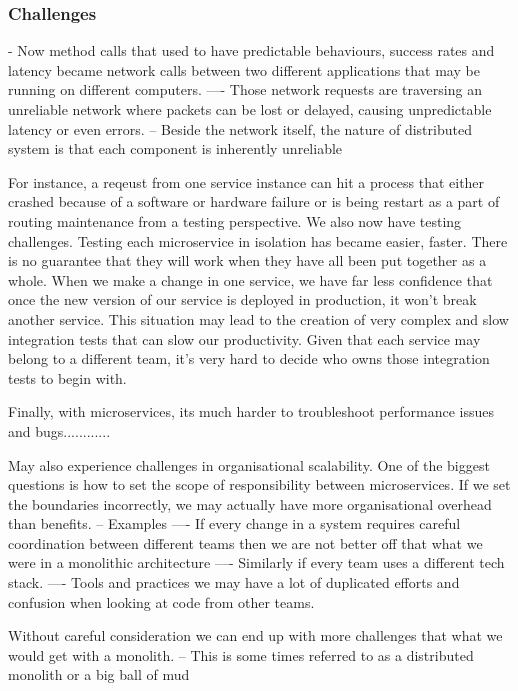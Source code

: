 \documentclass[a4paper, 11pt]{book}
\begin{document}
    \subsubsection{Challenges}
    - Now method calls that used to have predictable behaviours, success rates and latency became network calls between two different applications that may be running on different computers.
    ---- Those network requests are traversing an unreliable network where packets can be lost or delayed, causing unpredictable latency or even errors.
    -- Beside the network itself, the nature of distributed system is that each component is inherently unreliable

    For instance, a reqeust from one service instance can hit a process that either crashed because of a software or hardware failure or is being restart as a part of routing maintenance from a testing perspective.
    We also now have testing challenges.
    Testing each microservice in isolation has became easier, faster.
    There is no guarantee that they will work when they have all been put together as a whole.
    When we make a change in one service, we have far less confidence that once the new version of our service is deployed in production, it won't break another service.
    This situation may lead to the creation of very complex and slow integration tests that can slow our productivity.
    Given that each service may belong to a different team, it's very hard to decide who owns those integration tests to begin with.

    Finally, with microservices, its much harder to troubleshoot performance issues and bugs............

    May also experience challenges in organisational scalability.
    One of the biggest questions is how to set the scope of responsibility between microservices.
    If we set the boundaries incorrectly, we may actually have more organisational overhead than benefits.
    -- Examples
    ---- If every change in a system requires careful coordination between different teams then we are not better off that what we were in a monolithic architecture
    ---- Similarly if every team uses a different tech stack.
    ---- Tools and practices we may have a lot of duplicated efforts and confusion when looking at code from other teams.

    Without careful consideration we can end up with more challenges that what we would get with a monolith.
    -- This is some times referred to as a distributed monolith or a big ball of mud
\end{document}
